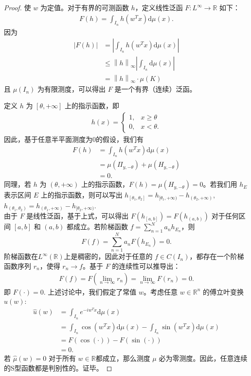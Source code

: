 \documentclass[12pt]{article}
\begin{document}
\begin{proof}
使 $w$ 为定值。对于有界的可测函数 $h$，定义线性泛函 $F: L^{\infty}\to\mathbb{R}$ 如下：
\begin{align*}
    F(h)=\int_{I_n} h(w^Tx)\mathrm{d}\mu(x).
\end{align*}
因为
\begin{align*}
\left|F(h)\right|&=\left|\int_{I_n}h(w^Tx)\mathrm{d}\mu(x)\right|\\
&\leq {\left\lVert h\right\rVert}_{\infty}\left|\int_{I_n}\mathrm{d}\mu(x)\right|\\
&={\left\lVert h\right\rVert}_{\infty}\cdot \mu(K)
\end{align*}
且 $\mu(I_n)$ 为有限测度，可以得出 $F$ 是一个有界（连续）泛函。

定义 $h$ 为 $[\theta,+\infty]$ 上的指示函数，即
\begin{align*}
    h(x)=\begin{cases}
        1, & x\geq \theta\\
        0, & x<\theta.
    \end{cases}
\end{align*}
因此，基于任意半平面测度为0的假设，我们有
\begin{align*}
    F(h)&=\int_{I_n} h(w^Tx)\mathrm{d}\mu(x)\\
    &=\mu(\Pi_{y,-\theta})+\mu(H_{y,-\theta})\\
    &=0.
\end{align*}
同理，若 $h$ 为 $(\theta,+\infty)$ 上的指示函数，$F(h)=\mu(H_{y,-\theta})=0$。若我们用 $h_E$ 表示区间 $E$ 上的指示函数，则可以写出
$
    h_{[\theta_1,\theta_2]}=h_{[\theta_1,+\infty)}-h_{(\theta_2,+\infty)}$,
    $h_{(\theta_1,\theta_2)}=h_{(\theta_1,+\infty)}-h_{[\theta_2,+\infty)}
$.
\\

由于 $F$ 是线性泛函，基于上式，可以得出 $F(h_{[a,b]})=F(h_{(a,b)})$ 对于任何区间 $[a,b]$ 和 $(a,b)$ 都成立。若阶梯函数 $f=\sum_{n=1}^N a_n h_{E_n}$，则 $$F(f)=\sum_{n=1}^N a_nF(h_{E_n})=0.$$
阶梯函数在$L^{\infty}(\mathbb{R})$上是稠密的，因此对于任意的 $f\in C(I_n)$，都存在一个阶梯函数序列 $r_n$，使得 $r_n\to f$。基于 $F$ 的连续性可以推导出：
\begin{align*}
    F(f)=F(\lim_{n\to\infty}r_n)=\lim_{n\to\infty} F(r_n)=0.
\end{align*}
即 $F(\cdot)=0$. 上述讨论中，我们假定了常值 $w$。考虑任意 $w\in \mathbb{R}^n$ 的傅立叶变换 $\hat{u}(w)$:
\begin{align*}
    \hat{u}(w)&=\int_{I_n} e^{-iw^Tx}\mathrm{d}\mu(x)\\
    &=\int_{I_n} \cos(w^Tx)\mathrm{d}\mu(x)-\int_{I_n} \sin(w^Tx)\mathrm{d}\mu(x)\\
    &=F(\cos(\cdot))-F(\sin(\cdot))\\
    &=0.
\end{align*}
若 $\hat{\mu}(w)=0$ 对于所有 $w\in \mathbb{R}$都成立，那么测度 $\mu$ 必为零测度。因此，任意连续的S型函数都是判别性的。证毕。

\end{proof}
\end{document}
